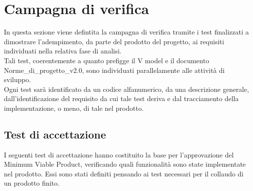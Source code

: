 \section{Campagna di verifica} \label{sec:test}
In questa sezione viene defintita la campagna di verifica tramite i test finalizzati a dimostrare l'adempimento, da parte del prodotto del progetto, ai requisiti individuati nella relativa fase di analisi.\\
Tali test, coerentemente a quanto prefigge il V model e il documento Norme\_di\_progetto\_v2.0, sono individuati parallelamente alle attività di sviluppo.\\
Ogni test sarà identificato da un codice alfanumerico, da una descrizione generale, dall'identificazione del requisito da cui tale test deriva e dal tracciamento della implementazione, o meno, di tale nel prodotto.

\subsection{Test di accettazione}
I seguenti test di accettazione hanno costituito la base per l'approvazione del Minimum Viable Product, verificando quali funzionalità sono state implementate nel prodotto. Essi sono stati definiti pensando ai test necessari per il collaudo di un prodotto finito.


